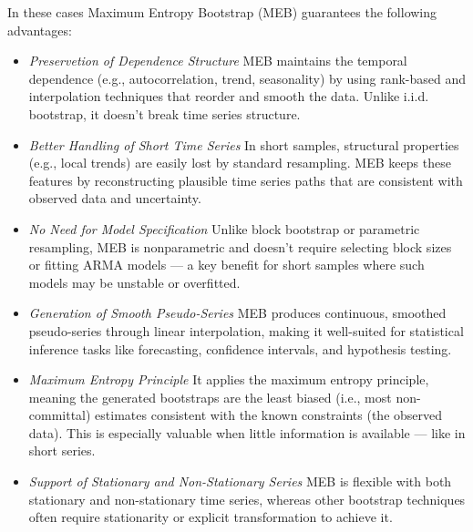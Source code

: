 \documentclass[ijoc,sglanonrev]{informs4}
\begin{document}
In these cases Maximum Entropy Bootstrap (MEB) guarantees the following advantages:

\begin{itemize}
    \item {\it Preservetion of Dependence Structure } MEB maintains the temporal dependence (e.g., autocorrelation, trend, seasonality) by using rank-based and interpolation techniques that reorder and smooth the data. Unlike i.i.d. bootstrap, it doesn’t break time series structure.

    \item {\it Better Handling of Short Time Series } In short samples, structural properties (e.g., local trends) are easily lost by standard resampling. MEB keeps these features by reconstructing plausible time series paths that are consistent with observed data and uncertainty.

    \item {\it No Need for Model Specification} Unlike block bootstrap or parametric resampling, MEB is nonparametric and doesn’t require selecting block sizes or fitting ARMA models — a key benefit for short samples where such models may be unstable or overfitted.

    \item {\it Generation of Smooth Pseudo-Series} MEB produces continuous, smoothed pseudo-series through linear interpolation, making it well-suited for statistical inference tasks like forecasting, confidence intervals, and hypothesis testing.

    \item {\it Maximum Entropy Principle} It applies the maximum entropy principle, meaning the generated bootstraps are the least biased (i.e., most non-committal) estimates consistent with the known constraints (the observed data). This is especially valuable when little information is available — like in short series.

    \item {\it Support of Stationary and Non-Stationary Series} MEB is flexible with both stationary and non-stationary time series, whereas other bootstrap techniques often require stationarity or explicit transformation to achieve it.
\end{itemize}
\end{document}
